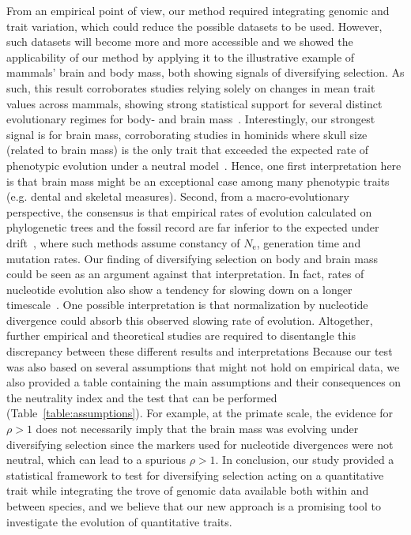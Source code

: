 \documentclass{article}
\newcommand{\Ne}{N_{\text{e}}}
\newcommand{\NI}{\rho}
\begin{document}
From an empirical point of view, our method required integrating genomic and trait variation, which could reduce the possible datasets to be used.
However, such datasets will become more and more accessible and we showed the applicability of our method by applying it to the illustrative example of mammals’ brain and body mass, both showing signals of diversifying selection.
As such, this result corroborates studies relying solely on changes in mean trait values across mammals, showing strong statistical support for several distinct evolutionary regimes for body- and brain mass~\citep{mitov_automatic_2019}.
Interestingly, our strongest signal is for brain mass, corroborating studies in hominids where skull size (related to brain mass) is the only trait that exceeded the expected rate of phenotypic evolution under a neutral model~\citep{lynch_rate_1990}.
Hence, one first interpretation here is that brain mass might be an exceptional case among many phenotypic traits (e.g. dental and skeletal measures).
Second, from a macro-evolutionary perspective, the consensus is that empirical rates of evolution calculated on phylogenetic trees and the fossil record are far inferior to the expected under drift~\citep{lynch_analysis_1990, uyeda_millionyear_2011}, where such methods assume constancy of $\Ne$, generation time and mutation rates.
Our finding of diversifying selection on body and brain mass could be seen as an argument against that interpretation.
In fact, rates of nucleotide evolution also show a tendency for slowing down on a longer timescale~\citep{rolland_conceptual_2023}.
One possible interpretation is that normalization by nucleotide divergence could absorb this observed slowing rate of evolution.
Altogether, further empirical and theoretical studies are required to disentangle this discrepancy between these different results and interpretations
Because our test was also based on several assumptions that might not hold on empirical data, we also provided a table containing the main assumptions and their consequences on the neutrality index and the test that can be performed (Table~\ref{table:assumptions}).
For example, at the primate scale, the evidence for $\NI > 1$ does not necessarily imply that the brain mass was evolving under diversifying selection since the markers used for nucleotide divergences were not neutral, which can lead to a spurious $\NI > 1$.
In conclusion, our study provided a statistical framework to test for diversifying selection acting on a quantitative trait while integrating the trove of genomic data available both within and between species, and we believe that our new approach is a promising tool to investigate the evolution of quantitative traits.
\end{document}
